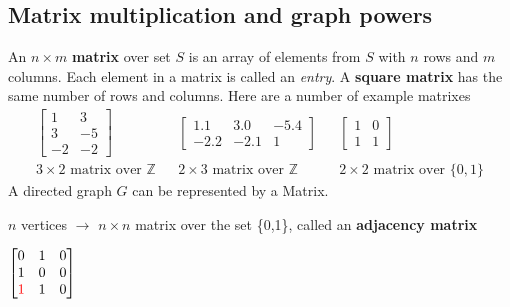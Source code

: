 \subsection{Matrix multiplication and graph powers}
An $n \times m$ \textbf{matrix} over set $S$ is an array of elements from $S$ with $n$ rows and $m$ columns.
Each element in a matrix is called an \textit{entry}.
A \textbf{square matrix} has the same number of rows and columns.
Here are a number of example matrixes
\begin{align*}
  \begin{bmatrix}
    1  & 3  \\
    3  & -5 \\
    -2 & -2
  \end{bmatrix}
                                             &  &
  \begin{bmatrix}
    1.1  & 3.0  & -5.4 \\
    -2.2 & -2.1 & 1
  \end{bmatrix}
                                             &  &
  \begin{bmatrix}
    1 & 0 \\
    1 & 1
  \end{bmatrix}                                                                                                                          \\
  3 \times 2 \text{ matrix over } \mathbb{Z} &  & 2 \times 3 \text{ matrix over } \mathbb{Z} &  & 2 \times 2 \text{ matrix over } \{0,1\}
\end{align*}
A directed graph $G$ can be represented by a Matrix.
\begin{center}
  $n$ vertices $\rightarrow$ $n \times n$ matrix over the set \{0,1\}, called an \textbf{adjacency matrix}
\end{center}
\begin{center}
  $
    \begin{bmatrix}
      0                       & 1 & 0 \\
      1                       & 0 & 0 \\
      \text{\textcolor{red}1} & 1 & 0
    \end{bmatrix}
  $
\end{center}
